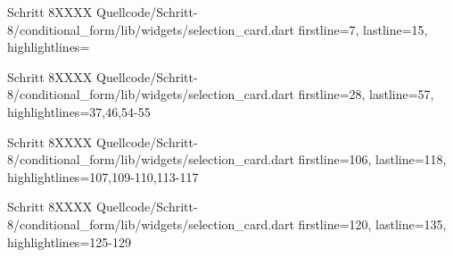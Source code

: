   \begin{alexlisting}{Schritt 8}{XXXX}
    {Quellcode/Schritt-8/conditional_form/lib/widgets/selection_card.dart}
    {firstline=7, lastline=15, highlightlines={}}
    \label{lst:Schritt6XXXX}
\end{alexlisting}
\begin{alexlisting}{Schritt 8}{XXXX}
    {Quellcode/Schritt-8/conditional_form/lib/widgets/selection_card.dart}
    {firstline=28, lastline=57, highlightlines={37,46,54-55}}
    \label{lst:Schritt6XXXX}
\end{alexlisting}
\begin{alexlisting}{Schritt 8}{XXXX}
    {Quellcode/Schritt-8/conditional_form/lib/widgets/selection_card.dart}
    {firstline=106, lastline=118, highlightlines={107,109-110,113-117}}
    \label{lst:Schritt6XXXX}
\end{alexlisting}

\begin{alexlisting}{Schritt 8}{XXXX}
    {Quellcode/Schritt-8/conditional_form/lib/widgets/selection_card.dart}
    {firstline=120, lastline=135, highlightlines={125-129}}
    \label{lst:Schritt6XXXX}
\end{alexlisting} 

\ifIncludeFigures \clearpage \fi 
